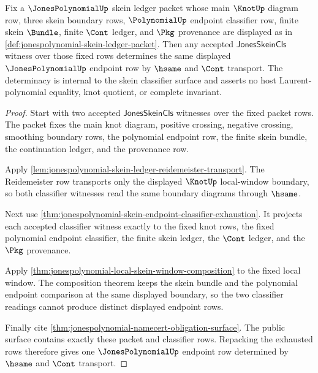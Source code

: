 \begin{theorem}
\label{thm:jonespolynomial-skein-classifier-determinacy}
Fix a $\JonesPolynomialUp$ skein ledger packet whose main $\KnotUp$ diagram row,
three skein boundary rows, $\PolynomialUp$ endpoint classifier row, finite
skein $\Bundle$, finite $\Cont$ ledger, and $\Pkg$ provenance are displayed as in
\autoref{def:jonespolynomial-skein-ledger-packet}. Then any accepted
$\mathsf{JonesSkeinCls}$ witness over those fixed rows determines the same
displayed $\JonesPolynomialUp$ endpoint row by $\hsame$ and $\Cont$ transport.
The determinacy is internal to the skein classifier surface and asserts no host
Laurent-polynomial equality, knot quotient, or complete invariant.
\end{theorem}
\begin{proof}
Start with two accepted $\mathsf{JonesSkeinCls}$ witnesses over the fixed packet
rows. The packet fixes the main knot diagram, positive crossing, negative
crossing, smoothing boundary rows, the polynomial endpoint row, the finite
skein bundle, the continuation ledger, and the provenance row.

Apply \autoref{lem:jonespolynomial-skein-ledger-reidemeister-transport}. The
Reidemeister row transports only the displayed $\KnotUp$ local-window boundary,
so both classifier witnesses read the same boundary diagrams through $\hsame$.

Next use \autoref{thm:jonespolynomial-skein-endpoint-classifier-exhaustion}. It
projects each accepted classifier witness exactly to the fixed knot rows, the
fixed polynomial endpoint classifier, the finite skein ledger, the $\Cont$
ledger, and the $\Pkg$ provenance.

Apply \autoref{thm:jonespolynomial-local-skein-window-composition} to the fixed
local window. The composition theorem keeps the skein bundle and the polynomial
endpoint comparison at the same displayed boundary, so the two classifier
readings cannot produce distinct displayed endpoint rows.

Finally cite \autoref{thm:jonespolynomial-namecert-obligation-surface}. The
public surface contains exactly these packet and classifier rows. Repacking the
exhausted rows therefore gives one $\JonesPolynomialUp$ endpoint row determined
by $\hsame$ and $\Cont$ transport.
\end{proof}


